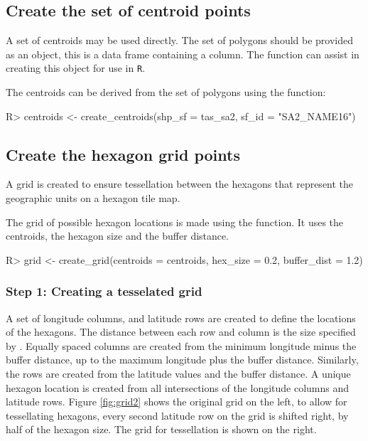 \documentclass[
]{jss}
\begin{document}
\hypertarget{create-the-set-of-centroid-points}{%
\subsection{Create the set of centroid
points}\label{create-the-set-of-centroid-points}}

A set of centroids may be used directly. The set of polygons should be
provided as an  object, this is a data frame containing a
 column. The  function can assist in
creating this object for use in \texttt{R}.

The centroids can be derived from the set of polygons using the
 function:

\begin{CodeChunk}

\begin{CodeInput}
R> centroids <- create_centroids(shp_sf = tas_sa2, sf_id = "SA2_NAME16")
\end{CodeInput}
\end{CodeChunk}

\hypertarget{create-the-hexagon-grid-points}{%
\subsection{Create the hexagon grid
points}\label{create-the-hexagon-grid-points}}

A grid is created to ensure tessellation between the hexagons that
represent the geographic units on a hexagon tile map.

The grid of possible hexagon locations is made using the
 function. It uses the centroids, the hexagon size and
the buffer distance.

\begin{CodeChunk}

\begin{CodeInput}
R> grid <- create_grid(centroids = centroids, hex_size = 0.2, buffer_dist = 1.2)
\end{CodeInput}
\end{CodeChunk}

\hypertarget{step-1-creating-a-tesselated-grid}{%
\subsubsection{Step 1: Creating a tesselated
grid}\label{step-1-creating-a-tesselated-grid}}

A set of longitude columns, and latitude rows are created to define the
locations of the hexagons. The distance between each row and column is
the size specified by . Equally spaced columns are
created from the minimum longitude minus the buffer distance, up to the
maximum longitude plus the buffer distance. Similarly, the rows are
created from the latitude values and the buffer distance. A unique
hexagon location is created from all intersections of the longitude
columns and latitude rows. Figure \ref{fig:grid2} shows the original
grid on the left, to allow for tessellating hexagons, every second
latitude row on the grid is shifted right, by half of the hexagon size.
The grid for tessellation is shown on the right.
\end{document}
